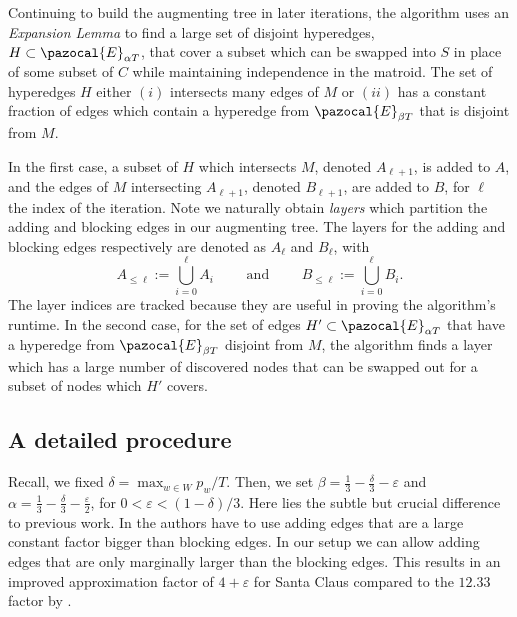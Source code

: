 Continuing to build the augmenting tree in later iterations, 
the algorithm uses an \textit{Expansion Lemma} to find a large set of disjoint hyperedges, 
$H \subset \pazocal{E}_{\alpha T}$, that cover a subset which can be swapped into $S$ in place of some subset of 
$C$ while maintaining independence in the matroid. 
The set of hyperedges $H$ either $(i)$ intersects many edges of $M$ or 
$(ii)$ has a constant fraction of  edges which contain a hyperedge from $\pazocal{E}_{\beta T}$ that is disjoint from $M$. 


In the first case, a subset of $H$ which intersects $M$, denoted $A_{\ell+1}$, 
is added to $A$,
and the edges of $M$ intersecting $A_{\ell+1}$, denoted $B_{\ell+1}$, are added to $B$, 
for $\ell$ the index of the iteration. 
Note we naturally obtain \textit{layers} which partition the adding and blocking edges in our augmenting tree. 
The layers for the adding and blocking edges respectively are denoted as $A_{\ell}$ and $B_{\ell}$, with 
\[
A_{\leq \ell} := \bigcup\limits_{i=0}^{\ell} A_i \qquad \text{ and }  \qquad B_{\leq \ell}:=\bigcup\limits_{i=0}^{\ell}B_i.
\]
The layer indices are tracked because they are useful in proving the algorithm's runtime. 
In the second case, for the set of edges $H' \subset \pazocal{E}_{\alpha T}$ 
that have a hyperedge from $\pazocal{E}_{\beta T}$ disjoint from $M$, 
the algorithm finds a layer which has a large number of discovered nodes that can be swapped out for a subset of nodes which $H'$ covers. 

\subsection{A detailed procedure}
   
      
Recall, we fixed $\delta = \max_{w \in W} p_w/T$. 
Then, we set
$\beta = \frac{1}{3}  - \frac{\delta}{3} -\varepsilon$ and $\alpha = \frac{1}{3} - \frac{\delta}{3} -\frac{\varepsilon}{2}$, for 
$0<\varepsilon < (1-\delta)/3$.
Here lies the subtle but crucial difference 
to previous work. In \cite{AlgoForSantaClaus-AnnamalaiKalaitzisSvenssonSODA15} the authors have
to use adding edges that are a large constant factor bigger than blocking edges. In our setup we can allow 
adding edges that are only marginally larger than the blocking edges.
 This results in an improved approximation factor of 
$4+\varepsilon$ for Santa Claus compared to the $12.33$ factor by \cite{AlgoForSantaClaus-AnnamalaiKalaitzisSvenssonSODA15}.

